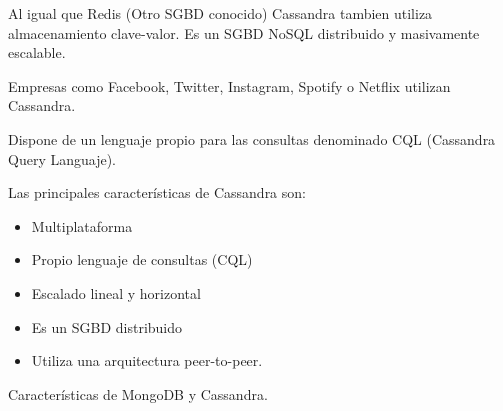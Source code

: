 \documentclass[12pt]{article}
\begin{document}
\begin{multicols}{2}
{\fontsize{9pt}{10.8pt}\selectfont Al igual que Redis (Otro SGBD conocido) Cassandra tambien utiliza almacenamiento clave-valor. Es un SGBD NoSQL distribuido y masivamente escalable.\par}\par

{\fontsize{9pt}{10.8pt}\selectfont Empresas como Facebook, Twitter, Instagram, Spotify o Netflix utilizan Cassandra.\par}\par

{\fontsize{9pt}{10.8pt}\selectfont Dispone de un lenguaje propio para las consultas denominado CQL (Cassandra Query Languaje).\par}\par

{\fontsize{9pt}{10.8pt}\selectfont Las principales características de Cassandra son:\par}\par

\begin{itemize}
	\item {\fontsize{9pt}{10.8pt}\selectfont Multiplataforma\par}\par

	\item {\fontsize{9pt}{10.8pt}\selectfont Propio lenguaje de consultas (CQL)\par}\par

	\item {\fontsize{9pt}{10.8pt}\selectfont Escalado lineal y horizontal\par}\par

	\item {\fontsize{9pt}{10.8pt}\selectfont Es un SGBD distribuido\par}\par

	\item {\fontsize{9pt}{10.8pt}\selectfont Utiliza una arquitectura peer-to-peer.\par}
\end{itemize}\par


\vspace{\baselineskip}

\vspace{\baselineskip}
{\fontsize{9pt}{10.8pt}\selectfont Características de MongoDB y Cassandra.\par}\par



\end{multicols}
\end{document}
